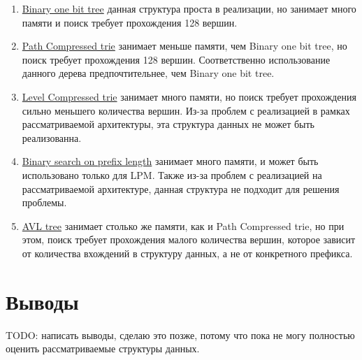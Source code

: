 \documentclass[a4peper, 12pt, titlepage, finall]{report}
\begin{document}
        \begin{enumerate}
            \item \underline{Binary one bit tree} данная структура проста в реализации, но занимает много памяти и поиск требует прохождения 128 вершин.
            \item \underline{Path Compressed trie} занимает меньше памяти, чем Binary one bit tree, но поиск требует прохождения 128 вершин. 
                Соответственно использование данного дерева предпочтительнее, чем Binary one bit tree.
            \item \underline{Level Compressed trie} занимает много памяти, но поиск требует прохождения сильно меньшего количества вершин. 
                Из-за проблем с реализацией в рамках рассматриваемой архитектуры, эта структура данных не может быть реализованна.
            \item \underline{Binary search on prefix length} занимает много памяти, и может быть использовано только для LPM. 
                Также из-за проблем с реализацией на рассматриваемой архитектуре, данная структура не подходит для решения проблемы.
            \item \underline{AVL tree} занимает столько же памяти, как и Path Compressed trie, но при этом, поиск требует прохождения малого количества вершин,
                которое зависит от количества вхождений в структуру данных, а не от конкретного префикса.
        \end{enumerate}

    \section {Выводы}
        {\ttfamily TODO: написать выводы, сделаю это позже, потому что пока не могу полностью оценить рассматриваемые структуры данных.}


        \printbibliography
\end{document}
